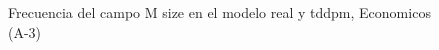 \begin{figure}[H]
    \centering
    
    \caption{Frecuencia del campo M size en el modelo real y tddpm, Economicos (A-3)}
    \label{frecuency-M Size-tddpm_mlp}
\end{figure}